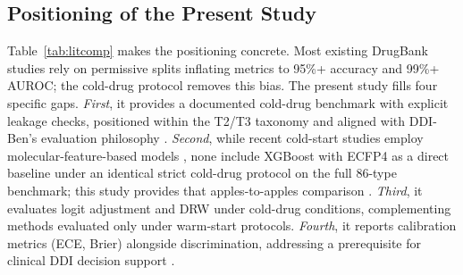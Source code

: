 \documentclass[11pt,a4paper,twocolumn]{article}
\begin{document}
\subsection{Positioning of the Present Study}
\label{sec:positioning}
Table~\ref{tab:litcomp} makes the positioning concrete.
Most existing DrugBank studies rely on permissive splits inflating metrics to
95\%+ accuracy and 99\%+ AUROC; the cold-drug protocol removes this bias.
The present study fills four specific gaps.
\textit{First}, it provides a documented cold-drug benchmark with explicit leakage
checks, positioned within the T2/T3 taxonomy \cite{lukashina2021coldstart} and
aligned with DDI-Ben's evaluation philosophy \cite{shen2025ddiben}.
\textit{Second}, while recent cold-start studies employ molecular-feature-based
models \cite{chen2023substructure, pang2023pretraining}, none include XGBoost
with ECFP4 as a direct baseline under an identical strict cold-drug protocol
on the full 86-type benchmark; this study provides that apples-to-apples
comparison \cite{boldini2023xgboost, jiang2021gnnvsdescriptor}.
\textit{Third}, it evaluates logit adjustment and DRW under cold-drug conditions,
complementing methods evaluated only under warm-start protocols.
\textit{Fourth}, it reports calibration metrics (ECE, Brier) alongside
discrimination, addressing a prerequisite for clinical DDI decision support
\cite{friesacher2025calibration}.
\end{document}

